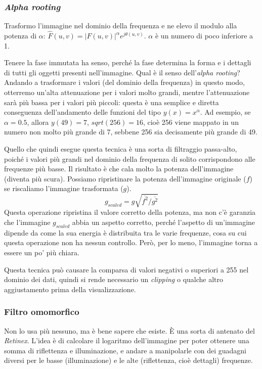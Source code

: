 \documentclass[a4paper,11pt]{article}
\begin{document}
\subsubsection{\textit{Alpha rooting}}
Trasformo l'immagine nel dominio della frequenza e ne elevo il modulo alla potenza di $\alpha$: $\hat{F}(u,v) = |F(u,v)|^\alpha e^{j \theta (u,v)}$.
$\alpha$ è un numero di poco inferiore a 1.
\par
Tenere la fase immutata ha senso, perché la fase determina la forma e i dettagli di tutti gli oggetti presenti nell'immagine.
Qual è il senso dell'\textit{alpha rooting}? Andando a trasformare i valori (del dominio della frequenza) in questo modo, otterremo un'alta attenuazione
per i valori molto grandi, mentre l'attenuazione sarà più bassa per i valori più piccoli: questa è una semplice e diretta conseguenza
dell'andamento delle funzioni del tipo $y(x)=x^\alpha$. Ad esempio, se $\alpha = 0.5$, allora $y(49) = 7$, $sqrt(256)=16$, cioè 256
viene mappato in un numero non molto più grande di 7, sebbene 256 sia decisamente più grande di 49.
\par
Quello che quindi esegue questa tecnica è una sorta di filtraggio passa-alto, poiché i valori più grandi nel dominio della frequenza di solito
corrispondono alle frequenze più basse. Il risultato è che cala molto la potenza dell'immagine (diventa più scura). Possiamo ripristinare la potenza
dell'immagine originale ($f$) se riscaliamo l'immagine trasformata ($g$).
\[
g_{scaled} = g \sqrt{\overline{f^2}/\overline{g^2}}
\]
Questa operazione ripristina il valore corretto della potenza, ma non c'è garanzia che l'immagine $g_{scaled}$ abbia un aspetto corretto,
perché l'aspetto di un'immagine dipende da come la sua energia è distribuita tra le varie frequenze, cosa su cui questa operazione non ha nessun controllo.
Però, per lo meno, l'immagine torna a essere un po' più chiara.
\par
Questa tecnica può causare la comparsa di valori negativi o superiori a 255 nel dominio dei dati, quindi si rende necessario un \textit{clipping} o qualche
altro aggiustamento prima della visualizzazione.

\subsubsection{Filtro omomorfico}
Non lo usa più nessuno, ma è bene sapere che esiste. È una sorta di antenato del \textit{Retinex}. L'idea è di calcolare il logaritmo dell'immagine per poter
ottenere una somma di riflettenza e illuminazione, e andare a manipolarle con dei guadagni diversi per le basse (illuminazione) e
le alte (riflettenza, cioè dettagli) frequenze.
\end{document}
